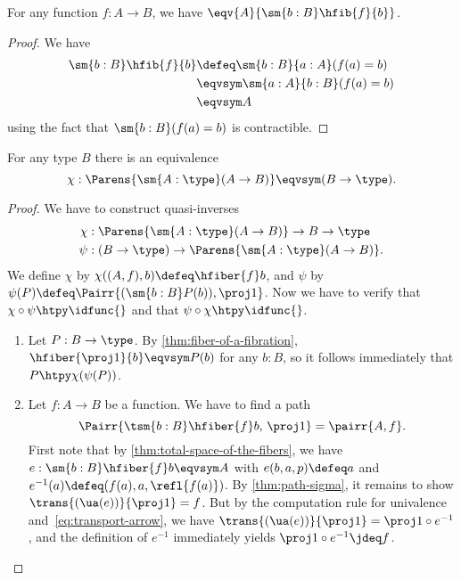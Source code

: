 \begin{lem}\label{thm:total-space-of-the-fibers}
  For any function $f:A\to B$, we have $\eqv{A}{\sm{b:B}\hfib{f}{b}}$.
\end{lem}
\begin{proof}
  We have
  \begin{align*}
    \sm{b:B}\hfib{f}{b} &\defeq \sm{b:B}{a:A} (f(a)=b)\\
    &\eqvsym \sm{a:A}{b:B} (f(a)=b)\\
    &\eqvsym A
  \end{align*}
  using the fact that $\sm{b:B} (f(a)=b)$ is contractible.
\end{proof}

\begin{thm}\label{thm:nobject-classifier-appetizer}
For any type $B$ there is an equivalence
\begin{equation*}
\chi:\Parens{\sm{A:\type} (A\to B)}\eqvsym (B\to\type).
\end{equation*}
\end{thm}
\begin{proof}
We have to construct quasi-inverses
\begin{align*}
\chi & : \Parens{\sm{A:\type} (A\to B)}\to B\to\type\\
\psi & : (B\to\type)\to\Parens{\sm{A:\type} (A\to B)}.
\end{align*}
We define $\chi$ by $\chi((A,f),b)\defeq\hfiber{f}b$, and $\psi$ by $\psi(P)\defeq\Pairr{(\sm{b:B} P(b)),\proj1}$.
Now we have to verify that $\chi\circ\psi\htpy\idfunc{}$ and that $\psi\circ\chi \htpy\idfunc{}$.
\begin{enumerate}
\item Let $P:B\to\type$.
  By \cref{thm:fiber-of-a-fibration},
$\hfiber{\proj1}{b}\eqvsym P(b)$ for any $b:B$, so it follows immediately
that $P\htpy\chi(\psi(P))$.
\item Let $f:A\to B$ be a function. We have to find a path
\begin{equation*}
\Pairr{\tsm{b:B} \hfiber{f}b,\,\proj1}=\pairr{A,f}.
\end{equation*}
First note that by \cref{thm:total-space-of-the-fibers}, we have
$e:\sm{b:B} \hfiber{f}b\eqvsym A$ with $e(b,a,p)\defeq a$ and $e^{-1}(a)
\defeq(f(a),a,\refl{f(a)})$.
By \cref{thm:path-sigma}, it remains to show $\trans{(\ua(e))}{\proj1} = f$.
But by the computation rule for univalence and~\eqref{eq:transport-arrow}, we have $\trans{(\ua(e))}{\proj1} = \proj1\circ e^{-1}$, and the definition of $e^{-1}$ immediately yields $\proj1 \circ e^{-1} \jdeq f$.\qedhere
\end{enumerate}
\end{proof}

